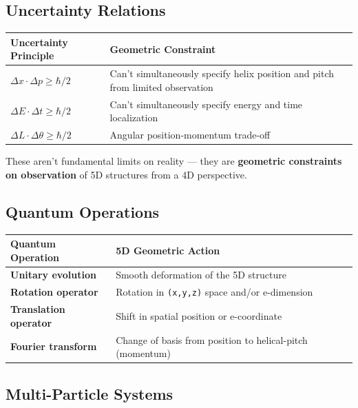 \documentclass[aps,prd,preprint,superscriptaddress,longbibliography,floatfix]{revtex4-2}
\theoremstyle{remark}
\begin{document}
\subsection{Uncertainty Relations}


\begin{table}[H]
\begin{ruledtabular}
\begin{tabular}{p{7.5cm}p{7.5cm}}
Uncertainty Principle & Geometric Constraint \\
\hline
\textbf{$\Delta x\cdot\Delta p \geq \hbar/2$} & Can't simultaneously specify helix position and pitch from limited observation \\
\textbf{$\Delta E\cdot\Delta t \geq \hbar/2$} & Can't simultaneously specify energy and time localization \\
\textbf{$\Delta L\cdot\Delta\theta \geq \hbar/2$} & Angular position-momentum trade-off \\
\end{tabular}
\end{ruledtabular}
\end{table}

These aren't fundamental limits on reality --- they are \textbf{geometric constraints on observation} of 5D structures from a 4D perspective.


\subsection{Quantum Operations}


\begin{table}[H]
\begin{ruledtabular}
\begin{tabular}{p{7.5cm}p{7.5cm}}
Quantum Operation & 5D Geometric Action \\
\hline
\textbf{Unitary evolution} & Smooth deformation of the 5D structure \\
\textbf{Rotation operator} & Rotation in \texttt{(x,y,z)} space and/or e-dimension \\
\textbf{Translation operator} & Shift in spatial position or e-coordinate \\
\textbf{Fourier transform} & Change of basis from position to helical-pitch (momentum) \\
\end{tabular}
\end{ruledtabular}
\end{table}


\subsection{Multi-Particle Systems}
\end{document}
